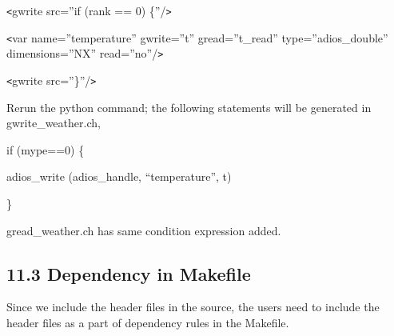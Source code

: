 \vspace{10pt}
\texttt{<}gwrite src=''if (rank == 0) \{''/\texttt{>}

\vspace{10pt}
\leftskip=18pt
\texttt{<}var name=''temperature'' gwrite=''t'' gread=''t\_read'' type=''adios\_double'' 
dimensions=''NX'' read=''no''/\texttt{>}

\vspace{10pt}
\leftskip=0pt
\texttt{<}gwrite src=''\}''/\texttt{>}

\vspace{10pt}
Rerun the python command; the following statements will be generated in gwrite\_weather.ch,

\vspace{10pt}
if (mype==0) \{

\vspace{10pt}
adios\_write (adios\_handle, ``temperature'', t)

\vspace{10pt}
\}

\vspace{10pt}
gread\_weather.ch has same condition expression added.\label{HToc84890289}\label{HToc212016665}\label{HToc212016907}\label{HToc182553438}

\vspace{10pt}
\subsection*{{\large 11.3 }{\large \textbf{Dependency in Makefile}}}

\vspace{10pt}
Since we include the header files in the source, the users need to include the 
header files as a part of dependency rules in the Makefile.\label{HToc82067534}\label{HToc84890290}\label{HToc212016666}\label{HToc212016908}\label{HToc182553439}
